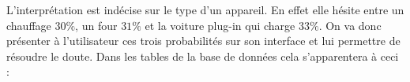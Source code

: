 \documentclass[10pt,a4paper]{article}
\begin{document}
\newpage
L'interprétation est indécise sur le type d'un appareil. En effet elle hésite entre un chauffage $30\%$, un four $31\%$ et la voiture plug-in qui charge $33\%$. On va donc présenter à l'utilisateur ces trois probabilités sur son interface et lui permettre de résoudre le doute. Dans les tables de la base de données cela s'apparentera à ceci :\\

\begin{table}[h!]
\end{table}
\end{document}
